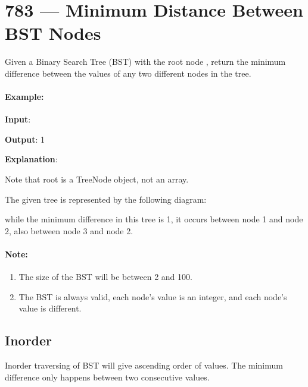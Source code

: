 \section{783 --- Minimum Distance Between BST Nodes}
Given a Binary Search Tree (BST) with the root node , return the minimum difference between the values of any two different nodes in the tree.

\paragraph{Example:}
\begin{flushleft}


\textbf{Input}: 

\textbf{Output}: 1

\textbf{Explanation}:

Note that root is a TreeNode object, not an array.

The given tree  is represented by the following diagram:

\begin{figure}[H]
\end{figure}


while the minimum difference in this tree is 1, it occurs between node 1 and node 2, also between node 3 and node 2.
\end{flushleft}
\paragraph{Note:}


\begin{enumerate}
\item The size of the BST will be between 2 and 100.
\item The BST is always valid, each node's value is an integer, and each node's value is different.
\end{enumerate}

\subsection{Inorder}
Inorder traversing of BST will give ascending order of values. The minimum difference only happens between two consecutive values.

